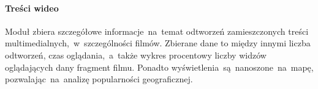 \paragraph{Treści wideo}
Moduł zbiera szczegółowe informacje~na~temat odtworzeń zamieszczonych treści multimedialnych,~w~szczególności filmów. Zbierane dane to między innymi liczba odtworzeń, czas oglądania,~a~także wykres procentowy liczby widzów oglądających dany fragment filmu. Ponadto wyświetlenia~są~nanoszone~na~mapę, pozwalając~na~analizę popularności geograficznej.
